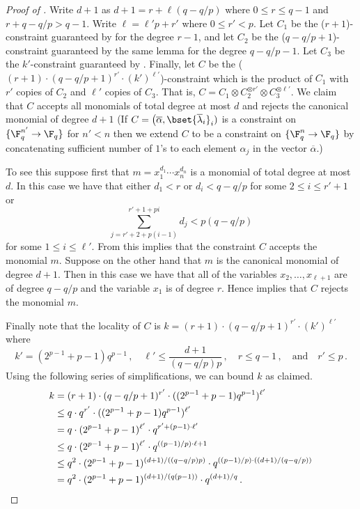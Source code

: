 \begin{proof}[Proof of ]
Write $d+1$ as $d+1 = r+ \ell (q-q/p) $ where $0 \leq r \leq q-1$ and $r+q-q/p > q-1$. Write $\ell = \ell' p + r'$ where $0 \leq r' < p$.
Let $C_1$ be the ($r+1$)-constraint guaranteed by  for the degree $r-1$, and let $C_2$
be the ($q-q/p+1$)-constraint guaranteed by the same lemma for the degree $q-q/p-1$. Let $C_3$ be
the $k'$-constraint guaranteed by .
Finally, let $C$ be the ($(r+1)\cdot (q-q/p+1)^{r'} \cdot (k')^{\ell'}$)-constraint which is the
product of $C_1$ with $r'$ copies of $C_2$ and $\ell'$ copies of $C_3$. That is,
$C =C_1 \otimes C_2^{\otimes r'} \otimes C_3^{\otimes \ell'}$.
We claim that $C$ accepts all monomials of total degree at most $d$ and rejects the canonical monomial of degree $d+1$
(If $C=\big(\overline \alpha, \bset{\overline \lambda_i }_i)$ is  a constraint on $\{\F_q^{n'} \to \F_q\}$ for $n' <n$ then we extend $C$ to be a constraint on $\{ \F_q^n \to \F_q \}$ by concatenating sufficient number of $1$'s
to each element $\alpha_j$ in the vector $\overline \alpha$.)

To see this suppose first that $m=x_1^{d_1} \cdots x_{n}^{d_n}$ is a monomial of total degree at most $d$.
In this case we have that either $d_1<r$ or $d_i <q-q/p$ for some $2
\leq i \leq r'+1$ or 
\[
\sum_{j=r' + 2 + p(i-1)}^{r' +1+pi} d_j < p(q-q/p)
\]
for some
$1 \leq i \leq \ell'$.
%
%
{}From  this implies that
the constraint $C$ accepts the monomial $m$. Suppose on the other  hand that $m$ is
the canonical monomial of degree $d+1$.  Then in this case we have that all
of the variables $x_2,\ldots, x_{\ell+1}$ are of degree $q-q/p$ and the variable $x_{1}$ is of degree $r$. Hence  implies that $C$ rejects the monomial $m$.


Finally note that the locality of $C$ is $k=(r+1)\cdot (q-q/p+1)^{r'}
\cdot (k')^{\ell'}$ where
\[
k' = (2^{p-1}+p-1)q^{p-1}\,,\quad \ell' \leq \frac{d+1}{(q-q/p)p}\,,\quad
r \leq q-1\,,\quad\text{and}\quad r' \leq p\,.
\]
Using the following series of simplifications, we can bound $k$ as claimed.
\begin{align*}
k
& =  (r+1)\cdot (q-q/p+1)^{r'} \cdot ((2^{p-1}+p-1)q^{p-1})^{\ell'} \\
& \leq  q \cdot q^{r'} \cdot ((2^{p-1}+p-1)q^{p-1})^{\ell'} \\
& =  q \cdot (2^{p-1}+p-1)^{\ell'} \cdot q^{r' + (p-1)\cdot \ell'} \\
& \leq  q \cdot (2^{p-1}+p-1)^{\ell'} \cdot q^{((p-1)/p) \cdot \ell + 1}\\
& \leq  q^2 \cdot (2^{p-1}+p-1)^{(d+1)/((q-q/p)p)} \cdot q^{((p-1)/p) \cdot ((d+1)/(q-q/p))}\\
& =  q^2 \cdot (2^{p-1}+p-1)^{(d+1)/(q(p-1))} \cdot q^{(d+1)/q}\,.\qedhere
\end{align*}
\end{proof}

